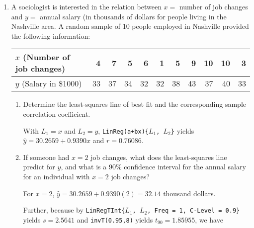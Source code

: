 \documentclass[10pt]{article}
\begin{document}
\newcommand{\answer}[1]{\color{red}#1}

\pagestyle{myheadings}

\begin{center}
\textbf{}
\end{center}

\begin{enumerate}

\item A sociologist is interested in the relation between $x =$ number of job changes and $y =$ annual salary (in thousands of dollars for people living in the Nashville area.  A random sample of 10 people employed in Nashville provided the following information: 

\begin{tabular}{l||rrrrrrrrrr}
\hline
$x$ (Number of job changes) & 4 & 7 & 5 & 6 & 1 & 5 & 9 & 10 & 10 & 3 \\
\hline
$y$ (Salary in \$1000) & 33 & 37 & 34 & 32 & 32 & 38 & 43 & 37 & 40 & 33 \\
\hline
\end{tabular}


	\begin{enumerate}
	\item Determine the least-squares line of best fit and the corresponding sample correlation coefficient. 
	
	{\answer With $L_1 = x$ and $L_2 = y$, \texttt{LinReg(a+bx)\{$L_1$, $L_2$\}} yields $\hat{y}=30.2659 +0.9390x$ and $r=0.76086$.} 
	
	\item If someone had $x=2$ job changes, what does the least-squares line predict for $y$, and what is a 90\% confidence interval for the annual salary for an individual with $x=2$ job changes? 
	
	{\answer For $x=2$, $\hat{y} = 30.2659+0.9390(2) = 32.14$ thousand dollars. 
	
	Further, because by \texttt{LinRegTInt\{$L_1$, $L_2$, Freq = 1, C-Level = 0.9\}} yields $s = 2.5641$ and \texttt{invT(0.95,8)} yields $t_{90} = 1.85955$, we have 
	
}
\end{enumerate}
\end{enumerate}
\end{document}
